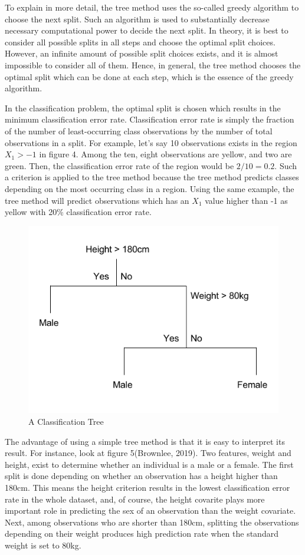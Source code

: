 \documentclass[11pt,a4paper,oneside]{article}
\begin{document}
To explain in more detail, the tree method uses the so-called greedy algorithm to choose the next split. Such an algorithm is used to substantially decrease necessary computational power to decide the next split. In theory, it is best to consider all possible splits in all steps and choose the optimal split choices. However, an infinite amount of possible split choices exists, and it is almost impossible to consider all of them. Hence, in general, the tree method chooses the optimal split which can be done at each step, which is the essence of the greedy algorithm.
\par
In the classification problem, the optimal split is chosen which results in the minimum classification error rate. Classification error rate is simply the fraction of the number of least-occurring class observations by the number of total observations in a split. For example, let's say 10 observations exists in the region $X_{1}>-1$ in figure 4. Among the ten, eight observations are yellow, and two are green. Then, the classification error rate of the region would be $2 / 10 = 0.2$. Such a criterion is applied to the tree method because the tree method predicts classes depending on the most occurring class in a region. Using the same example, the tree method will predict observations which has an $X_{1}$ value higher than -1 as yellow with 20\% classification error rate.
\par
\begin{figure}[!t]
    \centering
    \includegraphics[width=0.7\columnwidth]{Figures/cart.png}
    \caption{A Classification Tree}
    \label{fig:5}
\end{figure}
The advantage of using a simple tree method is that it is easy to interpret its result. For instance, look at figure 5(Brownlee, 2019).\cite{brownlee} Two features, weight and height, exist to determine whether an individual is a male or a female. The first split is done depending on whether an observation has a height higher than 180cm. This means the height criterion results in the lowest classification error rate in the whole dataset, and, of course, the height covarite plays more important role in predicting the sex of an observation than the weight covariate. Next, among observations who are shorter than 180cm, splitting the observations depending on their weight produces high prediction rate when the standard weight is set to 80kg. 
\end{document}
